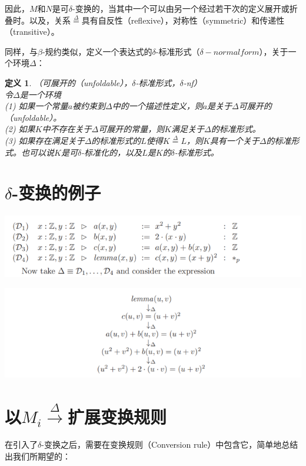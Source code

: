 \documentclass[UTF8]{article}
\newtheorem{thm}{定义}[section]
\begin{document}
		因此，$M$和$N$是可$\delta$-变换的，当其中一个可以由另一个经过若干次的定义展开或折叠时。以及，关系$\stackrel{\Delta}{=}$具有自反性（reflexive），对称性（symmetric）和传递性（transitive）。
		
		同样，与$\beta$-规约类似，定义一个表达式的$\delta$-标准形式（$\delta-normal form$），关于一个环境$\Delta$：
		
		\begin{thm}（可展开的（unfoldable），$\delta$-标准形式，$\delta$-nf）\\
			令$\Delta$是一个环境\\
			(1) 如果一个常量$a$被约束到$\Delta$中的一个描述性定义，则$a$是关于$\Delta$可展开的（unfoldable）。\\
			(2) 如果$K$中不存在关于$\Delta$可展开的常量，则$K$满足关于$\Delta$的标准形式。\\
			(3) 如果存在满足关于$\Delta$的标准形式的$L$使得$K\stackrel{\Delta}{=}L$，则$K$具有一个关于$\Delta$的标准形式。也可以说$K$是可$\delta$-标准化的，以及$L$是$K$的$\delta$-标准形式。
		\end{thm}
	
	\section{$\delta$-变换的例子}
	\noindent
	\includegraphics[width=0.93\linewidth]{"../imgs/9-1.png"}
		
		\noindent
		\includegraphics[width=0.93\linewidth]{"../imgs/9-2.png"}
		
	\section{以$M_i\stackrel{\Delta}{\rightarrow}$扩展变换规则}
	\noindent
	在引入了$\delta$-变换之后，需要在变换规则（Conversion rule）中包含它，简单地总结出我们所期望的：
	
\end{document}
